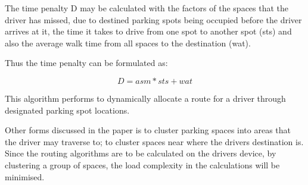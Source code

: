 The time penalty D may be calculated with the factors of the spaces that the driver has missed, due to destined parking spots being occupied before the driver arrives at it, the time it takes to drive from one spot to another spot (sts) and also the average walk time from all spaces to the destination (wat).

Thus the time penalty can be formulated as:

\[ D = asm * sts + wat \]

This algorithm performs to dynamically allocate a route for a driver through designated parking spot locations.

Other forms discussed in the paper \citep{Verroios2011ReachingNetworking} is to cluster parking spaces into areas that the driver may traverse to; to cluster spaces near where the drivers destination is. Since the routing algorithms are to be calculated on the drivers device, by clustering a group of spaces, the load complexity in the calculations will be minimised.
